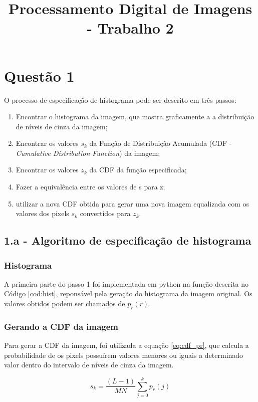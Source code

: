 \documentclass{article}
\title{Processamento Digital de Imagens - Trabalho 2}
\begin{document}
%
\maketitle

%
\section{Questão 1}

\label{subsec:1_a}
O processo de especificação de histograma pode ser descrito em três passos:

\begin{enumerate}
	\item Encontrar o histograma da imagem, que mostra graficamente a a distribuição de níveis de cinza da imagem;
	\item Encontrar os valores $s_k$ da Função de Distribuição Acumulada (CDF - \textit{Cumulative Distribution Function}) da imagem;
	\item Encontrar os valores $z_k$ da CDF da função especificada;
	\item Fazer a equivalência entre os valores de s para z;
	\item utilizar a nova CDF obtida para gerar uma nova imagem equalizada com os valores dos pixels $s_k$ convertidos para $z_k$.
\end{enumerate}

\subsection*{1.a - Algoritmo de especificação de histograma}
\subsubsection*{Histograma}
A primeira parte do passo 1 foi implementada em python na função descrita no Código \ref{cod:hist}, reponsável pela geração do histograma da imagem original. Os valores obtidos podem ser chamados de $p_r(r)$.

\subsubsection*{Gerando a CDF da imagem}
Para gerar a CDF da imagem, foi utilizada a equação \ref{eq:cdf_pr}, que calcula a probabilidade de os pixels possuírem valores menores ou iguais a determinado valor dentro do intervalo de níveis de cinza da imagem.

\begin{equation}
	\label{eq:cdf_pr}
	s_k = \frac{(L - 1)}{MN}\sum_{j = 0}^{k} p_r(j)
\end{equation}
\end{document}
